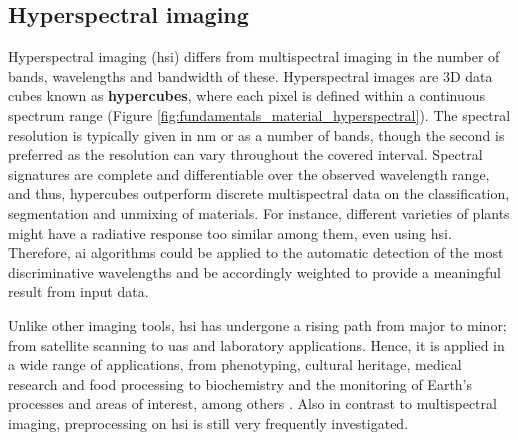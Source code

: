 \subsection{Hyperspectral imaging}

Hyperspectral imaging (\acrshort{hsi}) differs from multispectral imaging in the number of bands, wavelengths and bandwidth of these. Hyperspectral images are 3D data cubes known as \textbf{hypercubes}, where each pixel is defined within a continuous spectrum range (Figure \ref{fig:fundamentals_material_hyperspectral}). The spectral resolution is typically given in \si{\nano\meter} or as a number of bands, though the second is preferred as the resolution can vary throughout the covered interval. Spectral signatures are complete and differentiable over the observed wavelength range, and thus, hypercubes outperform discrete multispectral data on the classification, segmentation and unmixing of materials. For instance, different varieties of plants might have a radiative response too similar among them, even using \acrshort{hsi}. Therefore, \acrshort{ai} algorithms could be applied to the automatic detection of the most discriminative wavelengths and be accordingly weighted to provide a meaningful result from input data. 

Unlike other imaging tools, \acrshort{hsi} has undergone a rising path from major to minor; from satellite scanning to \acrshort{uas} and laboratory applications. Hence, it is applied in a wide range of applications, from phenotyping, cultural heritage, medical research and food processing to biochemistry and the monitoring of Earth's processes and areas of interest, among others \cite{amigo_hyperspectral_2019}. Also in contrast to multispectral imaging, preprocessing on \acrshort{hsi} is still very frequently investigated. 


